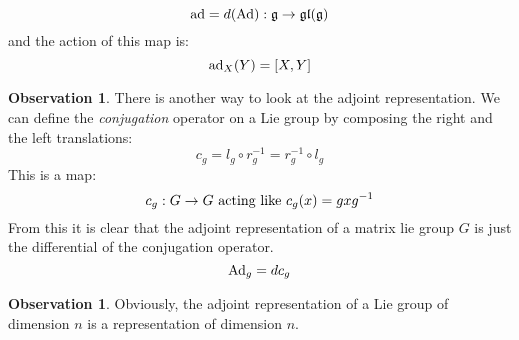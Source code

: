 \documentclass[12pt,a4paper]{report}
\theoremstyle{definition}
\theoremstyle{Theorem}
\theoremstyle{definition}
\theoremstyle{definition}
\newtheorem{Obs}[Def]{Observation}
\begin{document}
	$$\hbox{ad}=d(\hbox{Ad}):\mathfrak{g}\rightarrow\mathfrak{gl(g)}$$
	and the action of this map is:
	$$\hbox{ad}_X(Y)=[X,Y]$$
	\begin{Obs}
		There is another way to look at the adjoint representation. We can define the \textit{conjugation} operator on a Lie group by composing the right and the left translations:
		$$c_g=l_g\circ r_g^{-1}=r_g^{-1}\circ l_g$$
		This is a map:
		$$c_g:G\rightarrow G\hbox{ acting like } c_g(x)=gxg^{-1}$$
		From this it is clear that the adjoint representation of a matrix lie group $G$ is just the differential of the conjugation operator.
		$$\hbox{Ad}_g=dc_g$$
	\end{Obs}
	\begin{Obs}
		Obviously, the adjoint representation of a Lie group of dimension $n$ is a representation of dimension $n$.
	\end{Obs}
\end{document}

